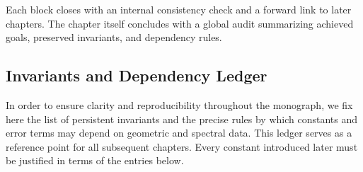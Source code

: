 Each block closes with an internal consistency check and a forward link
to later chapters. The chapter itself concludes with a global audit
summarizing achieved goals, preserved invariants, and dependency rules.


\subsection*{Invariants and Dependency Ledger}

In order to ensure clarity and reproducibility throughout the monograph, 
we fix here the list of persistent invariants and the precise rules by 
which constants and error terms may depend on geometric and spectral data.  
This ledger serves as a reference point for all subsequent chapters.  
Every constant introduced later must be justified in terms of the entries below.


